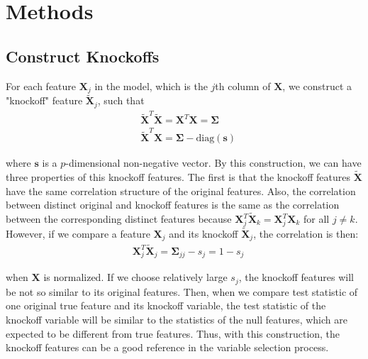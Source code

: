 \documentclass{uwstat572}
\begin{document}
\section{Methods}
\subsection{Construct Knockoffs}
For each feature $\bm{X}_j$ in the model, which is the $j$th column of $\bm{X}$, we construct a "knockoff" feature $\bm{\tilde X}_j$, such that 
\begin{align*}
& \tilde {\bm{X}}^T\tilde {\bm{X}} = \bm{X}^T\bm{X} = \bm{\Sigma} \\
& \tilde {\bm{X}}^T\bm{X} = \bm{\Sigma} - \text{diag}{(\bm{s})}
\end{align*}

where $\bm{s}$ is a $p$-dimensional non-negative vector. By this construction, we can have three properties of this knockoff features. The first is that the knockoff features $\bm{\tilde{X}}$ have the same correlation structure of the original features. Also, the correlation between distinct original and knockoff features is the same as the correlation between the corresponding distinct features because $\bm{X}_j^T\tilde{\bm{X}}_k = \bm{X}_j^T\bm{X}_k$ for all $j\neq k$. However, if we compare a feature $\bm{X}_j$ and its knockoff $\bm{\tilde X}_j$, the correlation is then:
\begin{align*}
& \bm{X}_j^T\tilde{\bm{X}}_j = \bm{\Sigma}_{jj} - s_j = 1-s_j
\end{align*}

when $\bm{X}$ is normalized. If we choose relatively large $s_j$, the knockoff features will be not so similar to its original features. Then, when we compare test statistic of one original true feature and its knockoff variable, the test statistic of the knockoff variable will be similar to the statistics of the null features, which are expected to be different from true features. Thus, with this construction, the knockoff features can be a good reference in the variable selection process. 
\end{document}
